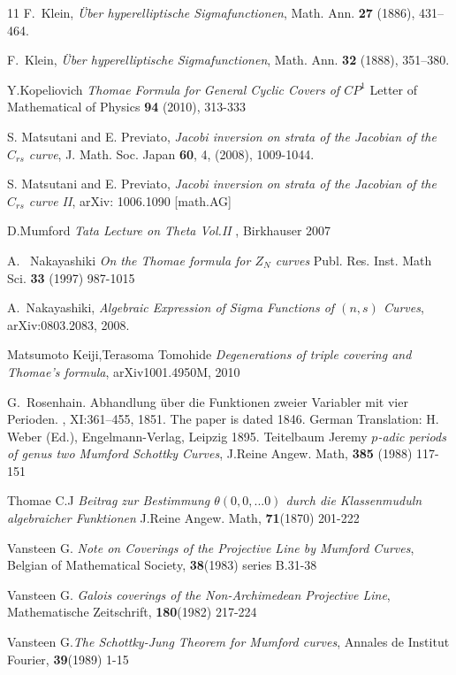 \documentclass[]{amsart}
\numberwithin{equation}{section}
\begin{document}
\begin{thebibliography}{11}
 F.~Klein, \emph{{\"U}ber hyperelliptische {S}igmafunctionen},
  Math. Ann.  \textbf{27} (1886), 431--464.

 F.~Klein, \emph{{\"U}ber hyperelliptische {S}igmafunctionen},
  Math. Ann.  \textbf{32} (1888), 351--380.

Y.Kopeliovich \emph{Thomae Formula for General Cyclic Covers of $CP^{1}$} 
Letter of Mathematical of Physics \textbf{94} (2010), 313-333


 S. Matsutani and E. Previato, \emph{Jacobi inversion on strata of the Jacobian of the $C_{rs}$ curve},
 J. Math. Soc. Japan \textbf{60}, 4, (2008), 1009-1044.

 S. Matsutani and E. Previato,
 \emph{Jacobi inversion on strata of the Jacobian of the $C_{rs}$ curve II},
 arXiv: 1006.1090 [math.AG]

 D.Mumford \emph{Tata Lecture on Theta Vol.II }, Birkhauser 2007

 A. ~Nakayashiki \emph{On the Thomae formula for $Z_N$ curves} Publ. Res. Inst. Math Sci. \textbf{33} (1997) 987-1015

 A.~Nakayashiki, \emph{{A}lgebraic {E}xpression of {S}igma
    {F}unctions of $(n,s)$ {C}urves}, arXiv:0803.2083, 2008.

 Matsumoto Keiji,Terasoma Tomohide
 \emph{Degenerations of triple covering and Thomae's formula},  arXiv1001.4950M, 2010

G.~Rosenhain.
\newblock Abhandlung {\"u}ber die {F}unktionen zweier {V}ariabler mit vier
  {P}erioden.
,
  XI:361--455, 1851.
\newblock The paper is dated 1846. German Translation: H. Weber (Ed.),
  Engelmann-Verlag, Leipzig 1895.
 Teitelbaum Jeremy
\emph{$p$-adic periods of genus two Mumford Schottky Curves},
J.Reine Angew. Math, \textbf{385} (1988) 117-151


 Thomae C.J \emph{ Beitrag zur Bestimmung
 $\theta (0, 0, ... 0)$ durch die Klassenmuduln algebraicher Funktionen} 
J.Reine Angew. Math, \textbf{71}(1870) 201-222

Vansteen G. \emph{Note on Coverings of the Projective Line by Mumford Curves}, Belgian of Mathematical Society, \textbf{38}(1983) series B.31-38

 Vansteen G. \emph{Galois coverings of the Non-Archimedean Projective Line},  Mathematische Zeitschrift, \textbf{180}(1982) 217-224

 Vansteen G.\emph{The Schottky-Jung Theorem for Mumford curves}, Annales de Institut  Fourier, \textbf{39}(1989) 1-15


\end{thebibliography}
\end{document}
